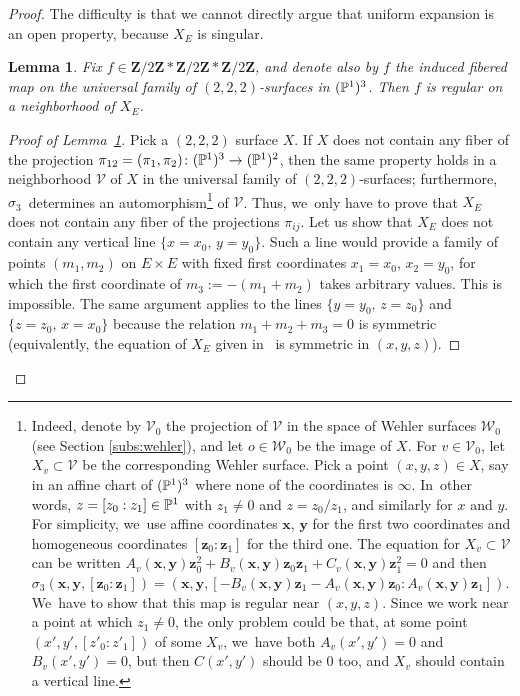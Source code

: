 \documentclass[11pt]{article}
\def\Z{\mathbf{Z}}
\newcommand{\bfx}{\boldsymbol{x}}
\newcommand{\bfy}{\boldsymbol{y}}
\newcommand{\bfz}{\boldsymbol{z}}
\newcommand{\cW}{\mathcal{W}}
\theoremstyle{plain}
\newtheorem{lem}[thm]{Lemma}
\theoremstyle{definition}
\numberwithin{equation}{section}
\begin{document}
\begin{proof}
The difficulty is that we cannot directly argue that uniform expansion is an open property, because
$X_E$ is singular.

\begin{lem}\label{lem:regular}
Fix $f\in \Z/2\Z\ast\Z/2\Z\ast\Z/2\Z$, and denote also by $f$ the induced fibered map on
the universal family of $(2,2,2)$-surfaces in $(\P^1)^3$.
Then $f$ is regular on a neighborhood of $X_E$.
\end{lem}

\begin{proof}[Proof of Lemma~\ref{lem:regular}] Pick a $(2,2,2)$ surface $X$. If $X$ does not contain any fiber
of the projection $\pi_{12}=(\pi_1,\pi_2)\colon (\P^1)^3\to (\P^1)^2$, then the same property holds in a neighborhood $\mathcal V$ of $X$ in the universal family of $(2,2,2)$-surfaces; furthermore, $\sigma_3$~determines an automorphism\footnote{Indeed,
denote by
${\mathcal{V}}_0$ the projection of $\mathcal V$ in the space of Wehler surfaces $ \cW_0$ (see Section \ref{subs:wehler}),
and let $o\in \cW_0$ be the image of $X$.
For $v\in {\mathcal{V}}_0$, let $X_v \subset {\mathcal V}$ be the corresponding Wehler surface.
Pick a point $(x,y,z)\in X$, say in an affine chart of $(\P^1)^3$ where none of the coordinates is $\infty$. In~other words, $z=[z_0:z_1]\in \P^1$ with $z_1\neq 0$ and $z=z_0/z_1$, and similarly for $x$ and $y$.
For simplicity, we~use affine coordinates $\bfx$, $\bfy$ for the first two coordinates and homogeneous coordinates $[\bfz_0:\bfz_1]$ for the third one. The equation for $X_v\subset \mathcal{V}$ can be written $A_v (\bfx,\bfy)\bfz_0^2+B_v(\bfx,\bfy)\bfz_0\bfz_1+C_v(\bfx,\bfy)\bfz_1^2=0$ and then $\sigma_3(\bfx, \bfy, [\bfz_0:\bfz_1])= (\bfx, \bfy, [-B_v(\bfx,\bfy) \bfz_1-A_v (\bfx, \bfy)\bfz_0 : A_v(\bfx,\bfy)\bfz_1])$. We~have to show that this map is regular near $(x,y,z)$. Since we work near a point at which $z_1\neq 0$, the only problem could be that, at some point $(x',y',[z'_0:z'_1])$ of some $X_v$, we~have both $A_v(x',y')=0$ and $B_v(x',y')=0$, but then $C(x',y')$ should be $0$ too, and $X_v$ should contain a vertical line.} of $\mathcal V$.
Thus, we~only have to prove that $X_E$ does not contain any fiber of the projections $\pi_{ij}$.
Let us show that $X_E$ does not contain any vertical line $\{x=x_0,\, y=y_0\}$. Such a line would provide a family of points $(m_1,m_2)$ on $E\times E$ with fixed first coordinates $x_1=x_0$, $x_2=y_0$, for which the first coordinate of $m_3:=-(m_1+m_2)$ takes arbitrary values. This is impossible. The same argument applies to the lines $\{y=y_0,\, z=z_0\}$ and $\{z=z_0,\, x=x_0\}$ because the relation $m_1+m_2+m_3=0$ is symmetric (equivalently, the equation of $X_E$ given in~\cite[\S 8.2]{Cantat:Panorama-Synthese} is symmetric in $(x,y,z)$).
\end{proof}


\end{proof}
\end{document}

